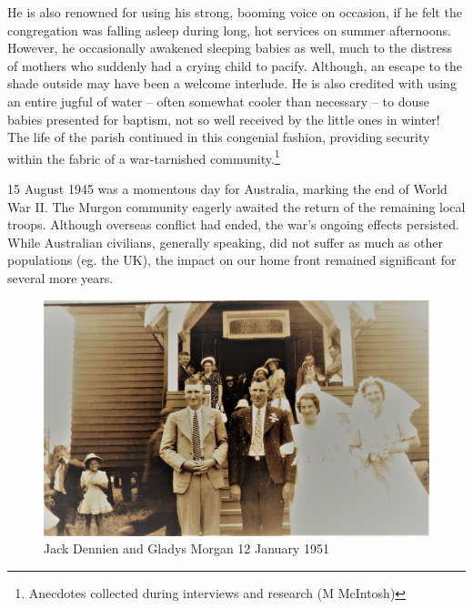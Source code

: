 He is also renowned for using his strong, booming voice on occasion, if he felt the congregation was falling asleep during long, hot services on summer afternoons. However, he occasionally awakened sleeping babies as well, much to the distress of mothers who suddenly had a crying child to pacify. Although, an escape to the shade outside may have been a welcome interlude. He is also credited with using an entire jugful of water -- often somewhat cooler than necessary -- to douse babies presented for baptism, not so well received by the little ones in winter! The life of the parish continued in this congenial fashion, providing security within the fabric of a war-tarnished community.\footnote{Anecdotes collected during interviews and research (M McIntosh)}


15 August 1945 was a momentous day for Australia, marking the end of World War II. The Murgon community eagerly awaited the return of the remaining local troops. Although overseas conflict had ended, the war's ongoing effects persisted. While Australian civilians, generally speaking, did not suffer as much as other populations (eg. the UK), the impact on our home front remained significant for several more years.









\begin{figure}[!htb]
\begin{center}
\includegraphics[width=1.\textwidth,center]{../images/JackDennienGladysMorgan12Jan1951.jpg}
\caption{Jack Dennien and Gladys Morgan 12 January 1951}
\end{center}
\end{figure}




